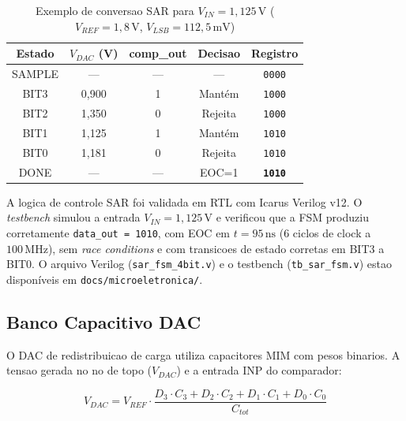\documentclass[12pt, a4paper]{article}
\begin{document}
\begin{table}[H]
\centering
\caption{Exemplo de conversao SAR para $V_{IN}=1{,}125\,\text{V}$
         ($V_{REF}=1{,}8\,\text{V}$, $V_{LSB}=112{,}5\,\text{mV}$)}
\label{tab:sar_exemplo}
\begin{tabular}{ccccc}
\toprule
\textbf{Estado} & \textbf{$V_{DAC}$ (V)} & \textbf{comp\_out} & \textbf{Decisao} & \textbf{Registro} \\
\midrule
SAMPLE & --- & --- & --- & \texttt{0000} \\
BIT3   & 0,900 & 1 & Mantém  & \texttt{1000} \\
BIT2   & 1,350 & 0 & Rejeita & \texttt{1000} \\
BIT1   & 1,125 & 1 & Mantém  & \texttt{1010} \\
BIT0   & 1,181 & 0 & Rejeita & \texttt{1010} \\
DONE   & ---   & --- & EOC=1 & \textbf{\texttt{1010}} \\
\bottomrule
\end{tabular}
\end{table}

\begin{conceitobox}
A logica de controle SAR foi validada em RTL com Icarus Verilog v12. O
\textit{testbench} simulou a entrada $V_{IN} = 1{,}125\,\text{V}$ e verificou
que a FSM produziu corretamente \texttt{data\_out = 1010}, com EOC em
$t = 95\,\text{ns}$ (6 ciclos de clock a $100\,\text{MHz}$), sem
\textit{race conditions} e com transicoes de estado corretas em BIT3 a BIT0.
O arquivo Verilog (\texttt{sar\_fsm\_4bit.v}) e o testbench
(\texttt{tb\_sar\_fsm.v}) estao disponíveis em \texttt{docs/microeletronica/}.
\end{conceitobox}

\subsection{Banco Capacitivo DAC}

O DAC de redistribuicao de carga utiliza capacitores MIM com pesos binarios.
A tensao gerada no no de topo ($V_{DAC}$) e a entrada INP do comparador:

\begin{equation}
  V_{DAC} = V_{REF} \cdot \frac{D_3 \cdot C_3 + D_2 \cdot C_2 + D_1 \cdot C_1
            + D_0 \cdot C_0}{C_{tot}}
\end{equation}
\end{document}
